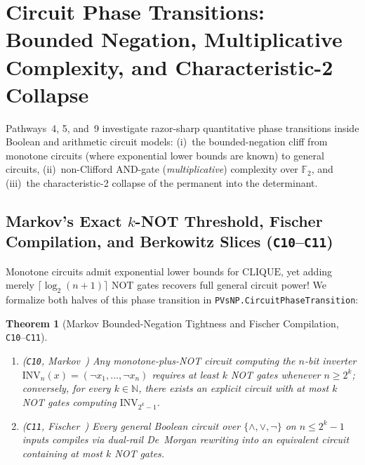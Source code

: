 \documentclass[11pt,reqno]{amsart}
\newcommand{\code}[1]{\texttt{\nolinkurl{#1}}}
\newtheorem{theorem}{Theorem}[section]
\theoremstyle{definition}
\newcommand{\F}{\mathbb{F}}
\newcommand{\N}{\mathbb{N}}
\begin{document}
\section{Circuit Phase Transitions: Bounded Negation, Multiplicative Complexity, and Characteristic-2 Collapse}
\label{sec:phase-transitions}

Pathways~4, 5, and~9 investigate razor-sharp quantitative phase transitions inside
Boolean and arithmetic circuit models: (i)~the bounded-negation cliff from monotone
circuits (where exponential lower bounds are known) to general circuits, (ii)~non-Clifford
AND-gate (\emph{multiplicative}) complexity over $\F_2$, and (iii)~the characteristic-2
collapse of the permanent into the determinant.

\subsection{Markov's Exact \texorpdfstring{$k$}{k}-NOT Threshold, Fischer Compilation, and Berkowitz Slices (\texttt{C10}--\texttt{C11})}
Monotone circuits admit exponential lower bounds for $\mathrm{CLIQUE}$, yet adding
merely $\lceil \log_2(n+1) \rceil$ NOT gates recovers full general circuit power! We
formalize both halves of this phase transition in \code{PVsNP.CircuitPhaseTransition}:

\begin{theorem}[Markov Bounded-Negation Tightness and Fischer Compilation, \texttt{C10}--\texttt{C11}]
\label{thm:markov-fischer}
\leavevmode
\begin{enumerate}[leftmargin=1.6em]
\item (\texttt{C10}, Markov~\cite{Markov1957}) Any monotone-plus-NOT circuit computing the
      $n$-bit inverter $\mathrm{INV}_n(x) = (\neg x_1,\dots,\neg x_n)$ requires at least
      $k$ NOT gates whenever $n \ge 2^k$; conversely, for every $k \in \N$, there exists
      an explicit circuit with at most $k$ NOT gates computing $\mathrm{INV}_{2^k - 1}$.
\item (\texttt{C11}, Fischer~\cite{Fischer1975}) Every general Boolean circuit over
      $\{\land,\lor,\neg\}$ on $n \le 2^k - 1$ inputs compiles via dual-rail De~Morgan
      rewriting into an equivalent circuit containing at most $k$ NOT gates.
\end{enumerate}
\end{theorem}
\end{document}
